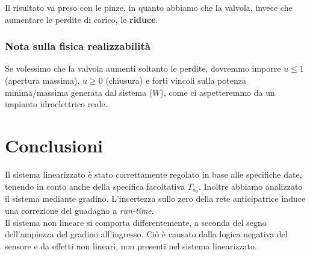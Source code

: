 \documentclass{article}
\begin{document}
Il risultato va preso con le pinze, in quanto abbiamo che la valvola, invece che aumentare le perdite di carico, le \textbf{riduce}.

\subsubsection{Nota sulla fisica realizzabilità}
Se volessimo che la valvola aumenti soltanto le perdite, dovremmo imporre $u\leq1$ (apertura massima), $u\geq0$ (chiusura) e forti vincoli sulla potenza minima/massima generata dal sistema ($W$), come ci aspetteremmo da un impianto idroelettrico reale.

\section{Conclusioni}

Il sistema linearizzato è stato correttamente regolato in base alle specifiche date, tenendo in conto anche della specifica facoltativa $T_{a_0}$. Inoltre abbiamo analizzato il sistema mediante gradino. L'incertezza sullo zero della rete anticipatrice induce una correzione del guadagno a \textit{run-time}.\\

Il sistema non lineare si comporta differentemente, a seconda del segno dell'ampiezza del gradino all'ingresso. Ciò è causato dalla logica negativa del sensore e da effetti non lineari, non presenti nel sistema linearizzato.
\end{document}
